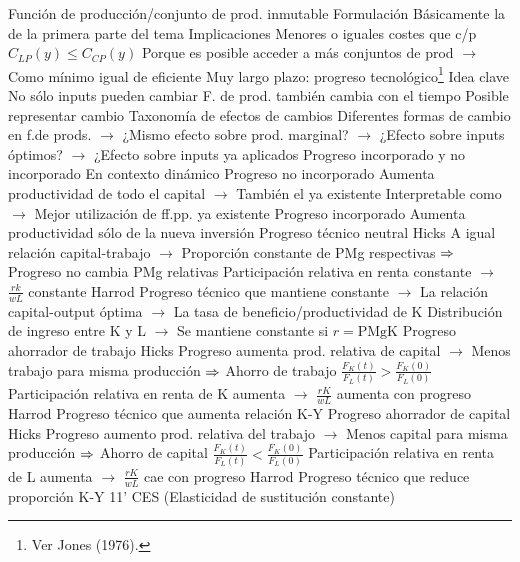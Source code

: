 \documentclass{nuevotema}
\begin{document}
\begin{esquemal}
				\4 Función de producción/conjunto de prod. inmutable
			\3 Formulación
				\4 Básicamente la de la primera parte del tema
			\3 Implicaciones
				\4 Menores o iguales costes que c/p
				\4[] $C_{LP}(y) \leq C_{CP}(y)$
				\4[] Porque es posible acceder a más conjuntos de prod
				\4[] $\to$ Como mínimo igual de eficiente
		\2 Muy largo plazo: progreso tecnológico\footnote{Ver Jones (1976).}
			\3 Idea clave
				\4 No sólo inputs pueden cambiar
				\4 F. de prod. también cambia con el tiempo
				\4 Posible representar cambio
				\4[] Taxonomía de efectos de cambios
				\4 Diferentes formas de cambio en f.de prods.
				\4[] $\to$ ¿Mismo efecto sobre prod. marginal?
				\4[] $\to$ ¿Efecto sobre inputs óptimos?
				\4[] $\to$ ¿Efecto sobre inputs ya aplicados
			\3 Progreso incorporado y no incorporado
				\4 En contexto dinámico
				\4 Progreso no incorporado
				\4[] Aumenta productividad de todo el capital
				\4[] $\to$ También el ya existente
				\4[] Interpretable como
				\4[] $\to$ Mejor utilización de ff.pp. ya existente
				\4 Progreso incorporado
				\4[] Aumenta productividad sólo de la nueva inversión
			\3 Progreso técnico neutral
				\4 Hicks
				\4[] A igual relación capital-trabajo
				\4[] $\to$ Proporción constante de PMg respectivas
				\4[] $\Rightarrow$ Progreso no cambia PMg relativas
				\4[] Participación relativa en renta constante
				\4[] $\to$ $\frac{rk}{wL}$ constante
				\4 Harrod
				\4[] Progreso técnico que mantiene constante
				\4[] $\to$ La relación capital-output óptima
				\4[] $\to$ La tasa de beneficio/productividad de K
				\4[] Distribución de ingreso entre K y L
				\4[] $\to$ Se mantiene constante si $r=\text{PMgK}$
			\3 Progreso ahorrador de trabajo
				\4 Hicks
				\4[] Progreso aumenta prod. relativa de capital
				\4[] $\to$ Menos trabajo para misma producción
				\4[] $\Rightarrow$ Ahorro de trabajo
				\4[] $\frac{F_K(t)}{F_L(t)} > \frac{F_K(0)}{F_L(0)}$
				\4[] Participación relativa en renta de K aumenta
				\4[] $\to$ $\frac{rK}{wL}$ aumenta con progreso
				\4 Harrod
				\4[] Progreso técnico que aumenta relación K-Y
			\3 Progreso ahorrador de capital
				\4 Hicks
				\4[] Progreso aumento prod. relativa del trabajo
				\4[] $\to$ Menos capital para misma producción
				\4[] $\Rightarrow$ Ahorro de capital
				\4[] $\frac{F_K(t)}{F_L(t)} < \frac{F_K(0)}{F_L(0)}$
				\4[] Participación relativa en renta de L aumenta
				\4[] $\to$ $\frac{rK}{wL}$ cae con progreso
				\4 Harrod
				\4[] Progreso técnico que reduce proporción K-Y
	\1  11'
		\2 CES (Elasticidad de sustitución constante)

\end{esquemal}
\end{document}
